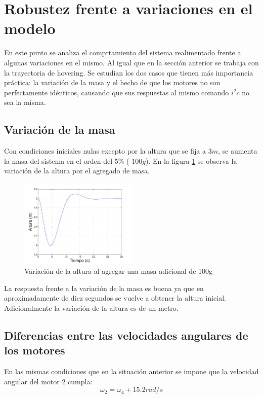 \documentclass[main]{subfiles}
\begin{document}
\section{Robustez frente a variaciones en el modelo}
\label{sec:robustez}

En este punto se analiza el comprtamiento del sistema realimentado frente a algunas variaciones en el mismo. Al igual que en la secci\'on anterior se trabaja con la trayectoria de hovering. Se estudian los dos casos que tienen m\'as importancia pr\'actica: la variaci\'on de la masa y el hecho de que los motores no son perfectamente id\'enticos, causando que sus respuestas al mismo comando $i^2c$ no sea la misma.
\subsection*{Variaci\'on de la masa}
Con condiciones iniciales nulas excepto por la altura que se fija a $3m$, se aumenta la masa del sistema en el orden del $5\%$ ( $100 g$). En la figura \ref{fig:masa} se observa la variaci\'on de la altura por el agregado de masa.


\begin{figure}[h!]
  \centering
	\includegraphics[width=0.5\textwidth]{./pics_sim_control/robustez/masa.pdf}
  \caption{Variaci\'on de la altura al agregar una masa adicional de 100g}
  \label{fig:masa}
\end{figure}

La respuesta frente a la variaci\'on de la masa es buena ya que en aproximadamente de diez segundos se vuelve a obtener la altura inicial. Adicionalmente la variaci\'on de la altura es de un metro. 

\subsection*{Diferencias entre las velocidades angulares de los motores}

En las mismas condiciones que en la situaci\'on anterior se impone que la velocidad angular del motor 2 cumpla: 
\begin{equation}
\omega_2 = \omega_4 + 15.2rad/s
\end{equation}
\end{document}
